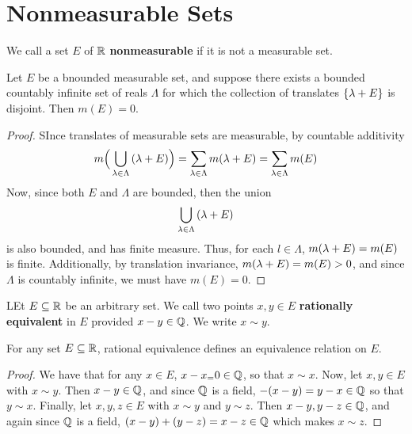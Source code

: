 \section{Nonmeasurable Sets}

\begin{definition}
    We call a set $E$ of $\mathbb{R}$ \textbf{nonmeasurable} if it is not a measurable
    set.
\end{definition}

\begin{lemma}\label{8.6.1}
    Let $E$ be a bnounded measurable set, and suppose there exists a bounded
    countably infinite set of reals $\Lambda$ for which the collection of
    translates  $\{\lambda+E\}$ is disjoint. Then $m(E)=0$.
\end{lemma}
\begin{proof}
    SInce translates of measurable sets are measurable, by countable additivity
    \begin{equation*}
        m\Big{(} \bigcup_{\lambda \in \Lambda}{(\lambda+E)} \Big{)}=
        \sum_{\lambda \in \Lambda}{m(\lambda+E)}=
        \sum_{\lambda \in \Lambda}{m(E)}
    \end{equation*}
    Now, since both $E$ and  $\Lambda$ are bounded, then the union
    \begin{equation*}
        \bigcup_{\lambda \in \Lambda}{(\lambda+E)}
    \end{equation*}
    is also bounded, and has finite measure. Thus, for each $l \in \Lambda$,
    $m(\lambda+E)=m(E)$ is finite. Additionally, by translation invariance,
    $m(\lambda+E)=m(E)>0$, and since $\Lambda$ is countably infinite, we must have
    $m(E)=0$.
\end{proof}

\begin{definition}
    LEt $E \subseteq \mathbb{R}$ be an arbitrary set. We call two points  $x,y \in E$
     \textbf{rationally equivalent} in $E$ provided  $x-y \in \mathbb{Q}$. We write  $x
     \sim y$.
\end{definition}

\begin{lemma}\label{8.6.2}
    For any set $E \subseteq \mathbb{R}$, rational equivalence defines an equivalence
    relation on $E$.
\end{lemma}
\begin{proof}
    We have that for any $x \in E$,  $x-x_=0 \in \mathbb{Q}$, so that $x \sim x$. Now,
    let $x,y \in E$ with $x \sim y$. Then  $x-y \in \mathbb{Q}$, and since $\mathbb{Q}$ is a
    field, $-(x-y)=y-x \in \mathbb{Q}$ so that $y \sim x$. Finally, let $x,y,z \in E$
    with $x \sim y$ and $y \sim z$. Then $x-y,y-z \in \mathbb{Q}$, and again since $\mathbb{Q}$
    is a field, $(x-y)+(y-z)=x-z \in \mathbb{Q}$ which makes $x \sim z$.
\end{proof}

